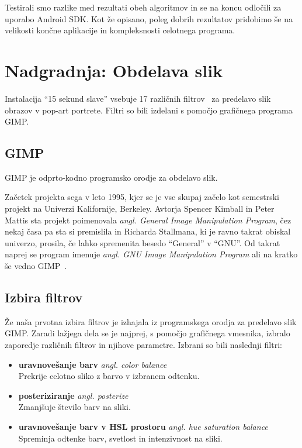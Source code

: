 Testirali smo razlike med rezultati obeh algoritmov in se na koncu odločili za
uporabo Android SDK. Kot že opisano, poleg dobrih rezultatov pridobimo še na
velikosti končne aplikacije in kompleksnosti celotnega programa.


\chapter{Nadgradnja: Obdelava slik}
\label{ch:obdelavaSlik}
Instalacija ``15 sekund slave'' vsebuje 17 različnih
filtrov~\cite[Poglavje~5]{thesisSamoJuvan} za predelavo slik obrazov v
pop-art portrete. Filtri so bili izdelani s pomočjo grafičnega programa GIMP.


\section{GIMP}
\label{sec:obdelavaSlikGIMP}
GIMP je odprto-kodno programsko orodje za obdelavo slik.


Začetek projekta sega v leto 1995, kjer se je vse skupaj začelo kot
semestrski projekt na Univerzi Kalifornije, Berkeley. Avtorja Spencer Kimball
in Peter Mattis sta projekt poimenovala \textit{angl. General Image
Manipulation Program}, čez nekaj časa pa sta si premislila in Richarda
Stallmana, ki je ravno takrat obiskal univerzo, prosila, če lahko spremenita
besedo ``General'' v ``GNU''. Od takrat naprej se program imenuje
\textit{angl. GNU Image Manipulation Program} ali na kratko še vedno
GIMP~\cite{wiki:GIMP}.


\section{Izbira filtrov}
Že naša prvotna izbira filtrov je izhajala iz programskega orodja za predelavo
slik GIMP. Zaradi lažjega dela se je najprej, s pomočjo grafičnega vmesnika,
izbralo zaporedje različnih filtrov in njihove parametre.  Izbrani so bili
naslednji filtri:
\begin{itemize}
    \item \textbf{uravnovešanje barv} \textit{angl. color balance} \hfill \\
        Prekrije celotno sliko z barvo v izbranem odtenku.
    \item \textbf{posteriziranje} \textit{angl. posterize} \hfill \\
        Zmanjšuje število barv na sliki.
    \item \textbf{uravnovešanje barv v HSL prostoru} \textit{angl. hue saturation balance} \hfill \\
        Spreminja odtenke barv, svetlost in intenzivnost na sliki.
\end{itemize}


